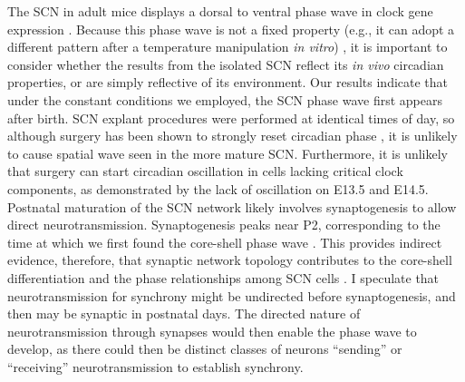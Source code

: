 The SCN in adult mice displays a dorsal to ventral phase wave in clock gene expression \cite{Yan2002, Quintero2003, Yamaguchi2003, Evans2011a}.
Because this phase wave is not a fixed property  (e.g., it can adopt a different pattern after a temperature manipulation \textit{in vitro}) \cite{Jeong2016}, it is important to consider whether the results from the isolated SCN reflect its \textit{in vivo} circadian properties, or are simply reflective of its environment.
Our results indicate that under the constant conditions we employed, the SCN phase wave first appears after birth.
SCN explant procedures were performed at identical times of day, so although surgery has been shown to strongly reset circadian phase \cite{Wreschnig2014, Landgraf2015}, it is unlikely to cause spatial wave seen in the more mature SCN.
Furthermore, it is unlikely that surgery can start circadian oscillation in cells lacking critical clock components, as demonstrated by the lack of oscillation on E13.5 and E14.5.
Postnatal maturation of the SCN network likely involves synaptogenesis to allow direct neurotransmission.
Synaptogenesis peaks near P2, corresponding to the time at which we first found the core-shell phase wave \cite{Bedont2015}.
This provides indirect evidence, therefore, that synaptic network topology contributes to the core-shell differentiation and the phase relationships among SCN cells \cite{Abel2016, Buijink2016}.
I speculate that neurotransmission for synchrony might be undirected before synaptogenesis, and then may be synaptic in postnatal days.
The directed nature of neurotransmission through synapses would then enable the phase wave to develop, as there could then be distinct classes of neurons ``sending'' or ``receiving'' neurotransmission to establish synchrony.

